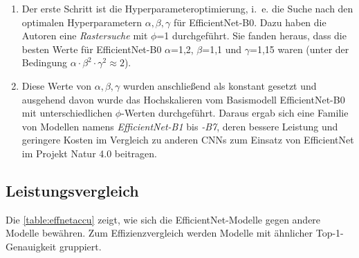 \begin{enumerate}
	\item Der erste Schritt ist die Hyperparameteroptimierung, i.~e. die Suche nach den optimalen Hyperparametern $\alpha, \beta, \gamma$ für EfficientNet-B0. Dazu haben die Autoren eine \emph{Rastersuche} mit $\phi$=1 durchgeführt. Sie fanden heraus, dass die besten Werte für EfficientNet-B0 $\alpha$=1,2, $\beta$=1,1 und $\gamma$=1,15 waren (unter der Bedingung $\alpha\cdot\beta^2\cdot\gamma^2 \approx 2$).
	
	\item Diese Werte von $\alpha, \beta, \gamma$ wurden anschließend als konstant gesetzt und ausgehend davon wurde das Hochskalieren vom Basismodell EfficientNet-B0 mit unterschiedlichen $\phi$-Werten durchgeführt. Daraus ergab sich eine Familie von Modellen namens \emph{EfficientNet-B1} bis \emph{-B7}, deren bessere Leistung und geringere Kosten im Vergleich zu anderen CNNs zum Einsatz von EfficientNet im Projekt Natur 4.0 beitragen.
\end{enumerate}

\subsection{Leistungsvergleich}

Die \autoref{table:effnetaccu} zeigt, wie sich die EfficientNet-Modelle gegen andere Modelle bewähren. Zum Effizienzvergleich werden Modelle mit ähnlicher Top-1-Genauigkeit gruppiert. 

